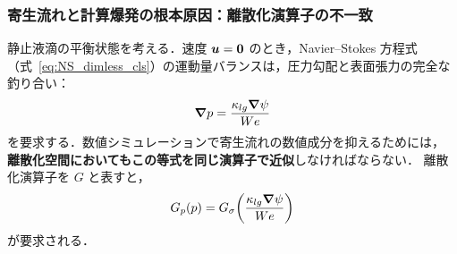 \subsubsection{寄生流れと計算爆発の根本原因：離散化演算子の不一致}
\label{sec:bf_operator_mismatch}

静止液滴の平衡状態を考える．速度 $\bm{u}=\bm{0}$ のとき，Navier--Stokes 方程式（式~\eqref{eq:NS_dimless_cls}）の運動量バランスは，圧力勾配と表面張力の完全な釣り合い：
\[
  \bm{\nabla} p = \frac{\kappa_{lg}\bm{\nabla}\psi}{We}
\]
を要求する．数値シミュレーションで寄生流れの数値成分を抑えるためには，
\textbf{離散化空間においてもこの等式を同じ演算子で近似}しなければならない．
離散化演算子を $G$ と表すと，
\[
  G_p(p) = G_\sigma\!\left(\frac{\kappa_{lg}\bm{\nabla}\psi}{We}\right)
\]
が要求される．

